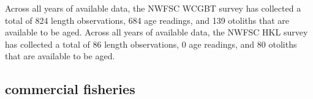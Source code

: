 \documentclass[11pt,
  english,
  letterpaper,
]{article}
\begin{document}
\leavevmode\tagmcend\tagstructend\par


Across all years of available data, the NWFSC WCGBT survey has collected a total of 824 length observations, 684 age readings, and 139 otoliths that are available to be aged. Across all years of available data, the NWFSC HKL survey has collected a total of 86 length observations, 0 age readings, and 80 otoliths that are available to be aged.

\leavevmode\tagmcend\tagstructend\par


\hypertarget{commercial-fisheries-58}{%
\subsection{commercial fisheries}\label{commercial-fisheries-58}}

\leavevmode\tagmcend\tagstructend


\begingroup\fontsize{10}{12}\selectfont \begingroup\fontsize{10}{12}\selectfont

\leavevmode\tagmcend\tagstructend\par
\end{document}

